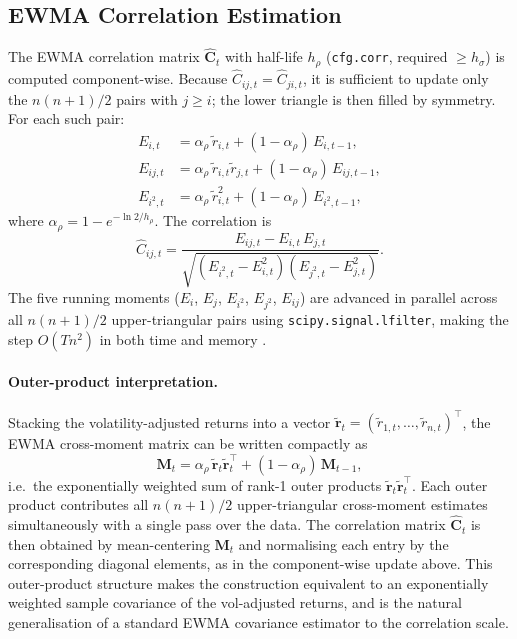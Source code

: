 \documentclass[11pt,a4paper]{article}
\newcommand{\C}{\mathbf{C}}
\begin{document}
\subsection{EWMA Correlation Estimation}
\label{sec:corr}

The EWMA correlation matrix $\hat{\C}_t$ with half-life $h_\rho$
(\texttt{cfg.corr}, required $\geq h_\sigma$) is computed component-wise.
Because $\hat{C}_{ij,t} = \hat{C}_{ji,t}$, it is sufficient to update only
the $n(n+1)/2$ pairs with $j \geq i$; the lower triangle is then filled by
symmetry.  For each such pair:
\begin{align}
  E_{i,t}   &= \alpha_\rho\,\tilde{r}_{i,t}   + (1-\alpha_\rho)\,E_{i,t-1}, \\
  E_{ij,t}  &= \alpha_\rho\,\tilde{r}_{i,t}\tilde{r}_{j,t}
               + (1-\alpha_\rho)\,E_{ij,t-1}, \\
  E_{i^2,t} &= \alpha_\rho\,\tilde{r}_{i,t}^2 + (1-\alpha_\rho)\,E_{i^2,t-1},
\end{align}
where $\alpha_\rho = 1 - e^{-\ln 2/h_\rho}$.  The correlation is
\begin{equation}
  \hat{C}_{ij,t} = \frac{E_{ij,t} - E_{i,t}\,E_{j,t}}
                        {\sqrt{(E_{i^2,t} - E_{i,t}^2)
                               (E_{j^2,t} - E_{j,t}^2)}}.
\end{equation}
The five running moments ($E_i$, $E_j$, $E_{i^2}$, $E_{j^2}$, $E_{ij}$)
are advanced in parallel across all $n(n+1)/2$ upper-triangular pairs using
\texttt{scipy.signal.lfilter}, making the step $O(T n^2)$ in both time and
memory \citep{hunter1986}.

\paragraph{Outer-product interpretation.}
Stacking the volatility-adjusted returns into a vector
$\tilde{\mathbf{r}}_t = (\tilde{r}_{1,t}, \dots, \tilde{r}_{n,t})^\top$,
the EWMA cross-moment matrix can be written compactly as
\begin{equation}
  \label{eq:outer_product}
  \mathbf{M}_t = \alpha_\rho\,\tilde{\mathbf{r}}_t\tilde{\mathbf{r}}_t^\top
               + (1-\alpha_\rho)\,\mathbf{M}_{t-1},
\end{equation}
i.e.\ the exponentially weighted sum of rank-1 outer products
$\tilde{\mathbf{r}}_t\tilde{\mathbf{r}}_t^\top$.  Each outer product
contributes all $n(n+1)/2$ upper-triangular cross-moment estimates
simultaneously with a single pass over the data.  The correlation matrix $\hat{\C}_t$ is then obtained
by mean-centering $\mathbf{M}_t$ and normalising each entry by the
corresponding diagonal elements, as in the component-wise update above.
This outer-product structure makes the construction equivalent to an
exponentially weighted sample covariance of the vol-adjusted returns, and
is the natural generalisation of a standard EWMA covariance estimator to
the correlation scale.
\end{document}
